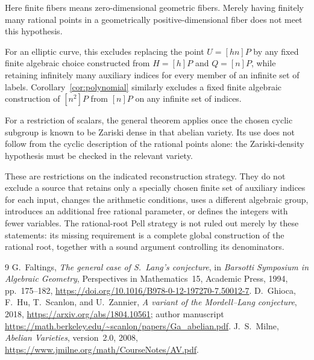 \documentclass[11pt,a4paper]{article}
\theoremstyle{remark}\newtheorem{remark}[theorem]{Remark}
\begin{document}
Here finite fibers means zero-dimensional geometric fibers.
Merely having finitely many rational points in a geometrically
positive-dimensional fiber does not meet this hypothesis.

For an elliptic curve, this excludes replacing the point
\(U=[hn]P\) by any fixed finite algebraic choice constructed
from \(H=[h]P\) and \(Q=[n]P\), while retaining infinitely
many auxiliary indices for every member of an infinite set of
labels. Corollary~\ref{cor:polynomial} similarly excludes a
fixed finite algebraic construction of \([n^2]P\) from
\([n]P\) on any infinite set of indices.

For a restriction of scalars, the general theorem applies once
the chosen cyclic subgroup is known to be Zariski dense in that
abelian variety. Its use does not follow from the cyclic
description of the rational points alone: the Zariski-density
hypothesis must be checked in the relevant variety.

These are restrictions on the indicated reconstruction
strategy. They do not exclude a source that retains only a
specially chosen finite set of auxiliary indices for each
input, changes the arithmetic conditions, uses a different
algebraic group, introduces an additional free rational
parameter, or defines the integers with fewer variables.
The rational-root Pell strategy is not ruled out merely by
these statements: its missing requirement is a complete global
construction of the rational root, together with a sound
argument controlling its denominators.

\begin{thebibliography}{9}
G.~Faltings, \emph{The general case of S.~Lang's conjecture},
in \emph{Barsotti Symposium in Algebraic Geometry},
Perspectives in Mathematics~15, Academic Press, 1994,
pp.~175--182,
\url{https://doi.org/10.1016/B978-0-12-197270-7.50012-7}.
D.~Ghioca, F.~Hu, T.~Scanlon, and U.~Zannier,
\emph{A variant of the Mordell--Lang conjecture}, 2018,
\url{https://arxiv.org/abs/1804.10561};
author manuscript
\url{https://math.berkeley.edu/~scanlon/papers/Ga_abelian.pdf}.
J.~S.~Milne, \emph{Abelian Varieties}, version~2.0, 2008,
\url{https://www.jmilne.org/math/CourseNotes/AV.pdf}.
\end{thebibliography}
\end{document}
